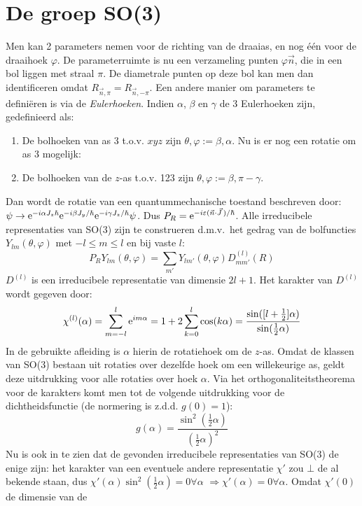 \documentclass[twoside]{report}
\begin{document}
\section{De groep SO(3)}
Men kan 2 parameters nemen voor de richting van de draaias, en nog \'e\'en
voor de draaihoek $\varphi$. De parameterruimte is nu een verzameling punten
$\varphi\vec{n}$, die in een bol liggen met straal $\pi$. De diametrale punten
op deze bol kan men dan identificeren omdat $R_{\vec{n},\pi}=R_{\vec{n},-\pi}$.
\npar
Een andere manier om parameters te defini\"eren is via de {\it Eulerhoeken}.
Indien $\alpha$, $\beta$ en $\gamma$ de 3 Eulerhoeken zijn, gedefinieerd als:
\begin{enumerate}
\item De bolhoeken van as 3 t.o.v. $xyz$ zijn $\theta,\varphi:=\beta,\alpha$.
      Nu is er nog een rotatie om as 3 mogelijk:
\item De bolhoeken van de $z$-as t.o.v. 123 zijn $\theta,\varphi:=\beta,\pi-\gamma$.
\end{enumerate}
Dan wordt de rotatie van een quantummechanische toestand beschreven door:\\
$\psi\rightarrow {\rm e}^{-i\alpha J_z\hbar}{\rm e}^{-i\beta J_y/\hbar}{\rm e}^{-i\gamma J_z/\hbar}\psi$.
Dus $\displaystyle P_R={\rm e}^{-i\varepsilon(\vec{n}\cdot\vec{J}\,)/\hbar}$.
\npar
Alle irreducibele representaties van SO(3) zijn te construeren d.m.v.\ het
gedrag van de bolfuncties $Y_{lm}(\theta,\varphi)$ met $-l\leq m\leq l$ en bij
vaste $l$:
\[
P_RY_{lm}(\theta,\varphi)=\sum_{m'}Y_{lm'}(\theta,\varphi)D^{(l)}_{mm'}(R)
\]
$D^{(l)}$ is een irreducibele representatie van dimensie $2l+1$. Het karakter
van $D^{(l)}$ wordt gegeven door:
\[
\chi^{(l)}(\alpha)=\sum_{m=-l}^{l}{\rm e}^{im\alpha}=1+2\sum_{k=0}^{l}\cos(k\alpha)=
\frac{\sin([l+\frac{1}{2}]\alpha)}{\sin(\frac{1}{2}\alpha)}
\]
In de gebruikte afleiding is $\alpha$ hierin de rotatiehoek om de $z$-as.
Omdat de klassen van SO(3) bestaan uit rotaties over dezelfde hoek om een
willekeurige as, geldt deze uitdrukking voor alle rotaties over hoek $\alpha$.
\npar
Via het orthogonaliteitstheorema voor de karakters komt men tot de volgende
uitdrukking voor de dichtheidsfunctie (de normering is z.d.d. $g(0)=1$):
\[
g(\alpha)=\frac{\sin^2(\frac{1}{2}\alpha)}{(\frac{1}{2}\alpha)^2}
\]
Nu is ook in te zien dat de gevonden irreducibele representaties van SO(3) de
enige zijn: het karakter van een eventuele andere representatie $\chi'$ zou
$\bot$ de al bekende staan, dus $\chi'(\alpha)\sin^2(\frac{1}{2}\alpha)=0\forall\alpha$
$\Rightarrow\chi'(\alpha)=0\forall\alpha$. Omdat $\chi'(0)$ de dimensie van de
\end{document}
